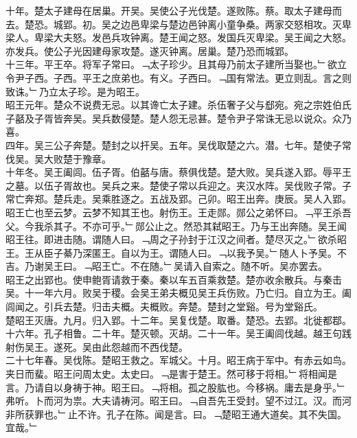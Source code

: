 \documentclass{zhvt-classic}
\begin{document}
\hspace*{2em}十年。楚太子建母在居巢。开吴。吴使公子光伐楚。遂败陈。蔡。取太子建母而去。楚恐。城郢。初。吴之边邑卑梁与楚边邑钟离小童争桑。两家交怒相攻。灭卑梁人。卑梁大夫怒。发邑兵攻钟离。楚王闻之怒。发国兵灭卑梁。吴王闻之大怒。亦发兵。使公子光因建母家攻楚。遂灭钟离。居巢。楚乃恐而城郢。\\
\hspace*{2em}十三年。平王卒。将军子常曰。﹁太子珍少。且其母乃前太子建所当娶也。﹂欲立令尹子西。子西。平王之庶弟也。有义。子西曰。﹁国有常法。更立则乱。言之则致诛。﹂乃立太子珍。是为昭王。\\
\hspace*{2em}昭王元年。楚众不说费无忌。以其谗亡太子建。杀伍奢子父与郄宛。宛之宗姓伯氏子嚭及子胥皆奔吴。吴兵数侵楚。楚人怨无忌甚。楚令尹子常诛无忌以说众。众乃喜。\\
\hspace*{2em}四年。吴三公子奔楚。楚封之以扞吴。五年。吴伐取楚之六。潜。七年。楚使子常伐吴。吴大败楚于豫章。\\
\hspace*{2em}十年冬。吴王阖闾。伍子胥。伯嚭与唐。蔡俱伐楚。楚大败。吴兵遂入郢。辱平王之墓。以伍子胥故也。吴兵之来。楚使子常以兵迎之。夹汉水阵。吴伐败子常。子常亡奔郑。楚兵走。吴乘胜逐之。五战及郢。己卯。昭王出奔。庚辰。吴人入郢。\\
\hspace*{2em}昭王亡也至云梦。云梦不知其王也。射伤王。王走郧。郧公之弟怀曰。﹁平王杀吾父。今我杀其子。不亦可乎。﹂郧公止之。然恐其弑昭王。乃与王出奔随。吴王闻昭王往。即进击随。谓随人曰。﹁周之子孙封于江汉之间者。楚尽灭之。﹂欲杀昭王。王从臣子綦乃深匿王。自以为王。谓随人曰。﹁以我予吴。﹂随人卜予吴。不吉。乃谢吴王曰。﹁昭王亡。不在随。﹂吴请入自索之。随不听。吴亦罢去。\\
\hspace*{2em}昭王之出郢也。使申鲍胥请救于秦。秦以车五百乘救楚。楚亦收余散兵。与秦击吴。十一年六月。败吴于稷。会吴王弟夫概见吴王兵伤败。乃亡归。自立为王。阖闾闻之。引兵去楚。归击夫概。夫概败。奔楚。楚封之堂谿。号为堂谿氏。\\
\hspace*{2em}楚昭王灭唐。九月。归入郢。十二年。吴复伐楚。取番。楚恐。去郢。北徙都鄀。\\
\hspace*{2em}十六年。孔子相鲁。二十年。楚灭顿。灭胡。二十一年。吴王阖闾伐越。越王句践射伤吴王。遂死。吴由此怨越而不西伐楚。\\
\hspace*{2em}二十七年春。吴伐陈。楚昭王救之。军城父。十月。昭王病于军中。有赤云如鸟。夹日而蜚。昭王问周太史。太史曰。﹁是害于楚王。然可移于将相。﹂将相闻是言。乃请自以身祷于神。昭王曰。﹁将相。孤之股肱也。今移祸。庸去是身乎。﹂弗听。卜而河为祟。大夫请祷河。昭王曰。﹁自吾先王受封。望不过江。汉。而河非所获罪也。﹂止不许。孔子在陈。闻是言。曰。﹁楚昭王通大道矣。其不失国。宜哉。﹂\\
\end{document}
